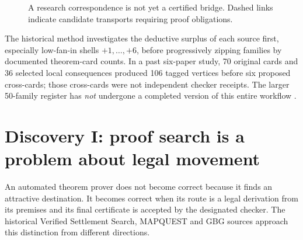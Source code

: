 \documentclass[11pt,letterpaper,oneside]{article}
\begin{document}
\begin{figure}[ht]
\centering
{}
\caption{A research correspondence is not yet a certified bridge. Dashed links indicate candidate transports requiring proof obligations.}
\end{figure}

The historical method investigates the deductive surplus of each source first, especially low-fan-in shells $+1,\ldots,+6$, before progressively zipping families by documented theorem-card counts. In a past six-paper study, 70 original cards and 36 selected local consequences produced 106 tagged vertices before six proposed cross-cards; those cross-cards were not independent checker receipts. The larger 50-family register has \emph{not} undergone a completed version of this entire workflow \cite{checkpoint}.

\section{Discovery I: proof search is a problem about legal movement}
An automated theorem prover does not become correct because it finds an attractive destination. It becomes correct when its route is a legal derivation from its premises and its final certificate is accepted by the designated checker. The historical Verified Settlement Search, MAPQUEST and GBG sources approach this distinction from different directions.
\end{document}
